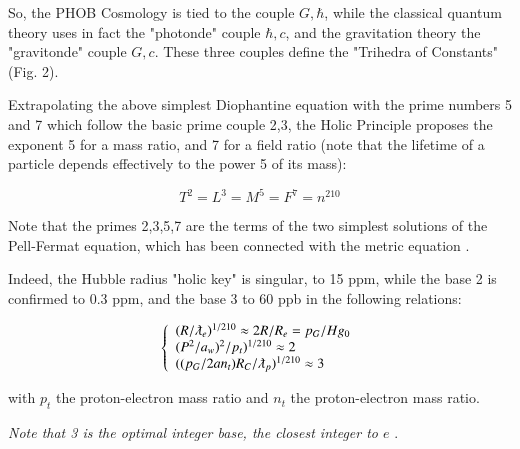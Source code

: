 \documentclass[a4paper,9pt]{article}
\begin{document}

So, the PHOB Cosmology is tied to the couple $G,\hbar$, while the classical quantum theory uses in fact the "photonde" couple $\hbar,c$, and the gravitation theory the "gravitonde" couple $G,c$. These three couples define the "Trihedra of Constants" 
(Fig. 2).




Extrapolating the above simplest Diophantine equation with the prime numbers 5 and 7 which follow the basic prime couple 2,3, the Holic Principle proposes the exponent 5 for a mass ratio, and 7 for a field ratio (note that the lifetime of a particle depends effectively to the power 5 of its mass):

\begin{equation}\label{Eq13}
T^2 = L^3 = M^5 = F^7 = n^{210}
 \end{equation}
 
 Note that the primes 2,3,5,7 are the terms of the two simplest solutions of the Pell-Fermat equation, which has been connected with the metric equation \cite{Sanchez5}. 
 
 Indeed, the Hubble radius "holic key" is singular, to 15 ppm, while the base 2 is confirmed to 0.3 ppm, and the base 3 to 60 ppb in the following relations:
 
 
 \begin{equation}\label{Eq14}
 \left\{
    \begin{array}{ll}
        (R/\lambdabar_e)^{1/210} \approx 2R/R_e = p_G/Hg_0 \\
    
        (P^2/a_w)^2/p_t)^{1/210}\approx 2\\
        
        ((p_G/2an_t) R_C/\lambdabar_p)^{1/210} \approx 3
    \end{array}
\right.
\end{equation}




with $p_t$ the proton-electron mass ratio and $n_t$ the proton-electron mass ratio. 

\textit{Note that 3 is the optimal integer base, the closest integer to $e$} \cite{Hayes}.

 
\end{document}
